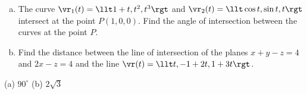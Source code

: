 \begin{question}[M200 2001D] %
\begin{enumerate}[(a)]
\item
The curve $\vr_1(t)=\llt 1+t, t^2, t^3\rgt$ and 
$\vr_2(t)=\llt \cos t, \sin t, t\rgt$ intersect at the point $P(1,0,0)$. 
Find the angle of intersection between the curves at the point $P$.

\item 
Find the distance between the line of intersection of the
planes $x+y-z=4$ and $2x-z=4$ and the line $\vr(t)=\llt t, -1+2t, 1+3t\rgt$.

\end{enumerate}
\end{question}


\begin{answer}
(a) $90^\circ$\qquad
(b) $2\sqrt{3}$
\end{answer}


